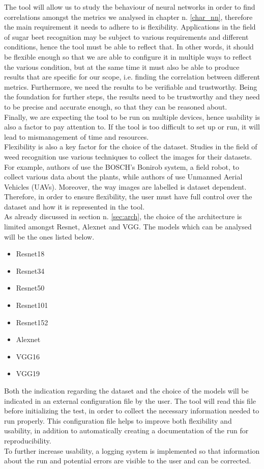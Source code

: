 The tool will allow us to study the behaviour of neural networks in order to find correlations amongst the metrics we analysed in chapter n. \ref{char_nn}, therefore the main requirement it needs to adhere to is flexibility. Applications in the field of sugar beet recognition may be subject to various requirements and different conditions, hence the tool must be able to reflect that. In other words, it should be flexible enough so that we are able to configure it in multiple ways to reflect the various condition, but at the same time it must also be able to produce results that are specific for our scope, i.e. finding the correlation between different metrics. Furthermore, we need the results to be verifiable and trustworthy. Being the foundation for further steps, the results need to be trustworthy and they need to be precise and accurate enough, so that they can be reasoned about. \\
Finally, we are expecting the tool to be run on multiple devices, hence usability is also a factor to pay attention to. If the tool is too difficult to set up or run, it will lead to mismanagement of time and resources. \\
Flexibility is also a key factor for the choice of the dataset. Studies in the field of weed recognition use various techniques to collect the images for their datasets. For example, authors of \cite{lu_survey_2020} use the BOSCH’s Bonirob system, a field robot, to collect various data about the plants, while authors of \cite{rs10111690} use Unmanned Aerial Vehicles (UAVs). Moreover, the way images are labelled is dataset dependent. 
Therefore, in order to ensure flexibility, the user must have full control over the dataset and how it is represented in the tool. \\
As already discussed in section n. \ref{sec:arch},  the choice of the architecture is limited amongst Resnet, Alexnet and VGG. The models which can be analysed will be the ones listed below. 
\begin{itemize}
\item Resnet18
\item Resnet34
\item Resnet50
\item Resnet101
\item Resnet152
\item Alexnet
\item VGG16
\item VGG19
\end{itemize}
Both the indication regarding the dataset and the choice of the models will be indicated in an external configuration file by the user. The tool will read this file before initializing the test, in order to collect the necessary information needed to run properly. This configuration file helps to improve both flexibility and usability, in addition to automatically creating a documentation of the run for reproducibility. \\
To further increase usability, a logging system is implemented so that information about the run and potential errors are visible to the user and can be corrected. \\


